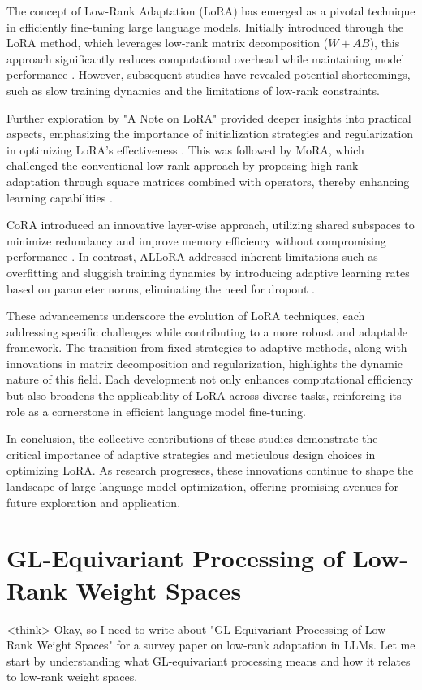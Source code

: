 \documentclass[conference]{IEEEtran}
\begin{document}
The concept of Low-Rank Adaptation (LoRA) has emerged as a pivotal technique in efficiently fine-tuning large language models. Initially introduced through the LoRA method, which leverages low-rank matrix decomposition ($W + AB$), this approach significantly reduces computational overhead while maintaining model performance \cite{bX}. However, subsequent studies have revealed potential shortcomings, such as slow training dynamics and the limitations of low-rank constraints.

Further exploration by "A Note on LoRA" provided deeper insights into practical aspects, emphasizing the importance of initialization strategies and regularization in optimizing LoRA's effectiveness \cite{bX}. This was followed by MoRA, which challenged the conventional low-rank approach by proposing high-rank adaptation through square matrices combined with operators, thereby enhancing learning capabilities \cite{bX}.

CoRA introduced an innovative layer-wise approach, utilizing shared subspaces to minimize redundancy and improve memory efficiency without compromising performance \cite{bX}. In contrast, ALLoRA addressed inherent limitations such as overfitting and sluggish training dynamics by introducing adaptive learning rates based on parameter norms, eliminating the need for dropout \cite{bX}.

These advancements underscore the evolution of LoRA techniques, each addressing specific challenges while contributing to a more robust and adaptable framework. The transition from fixed strategies to adaptive methods, along with innovations in matrix decomposition and regularization, highlights the dynamic nature of this field. Each development not only enhances computational efficiency but also broadens the applicability of LoRA across diverse tasks, reinforcing its role as a cornerstone in efficient language model fine-tuning.

In conclusion, the collective contributions of these studies demonstrate the critical importance of adaptive strategies and meticulous design choices in optimizing LoRA. As research progresses, these innovations continue to shape the landscape of large language model optimization, offering promising avenues for future exploration and application.

\section{GL-Equivariant Processing of Low-Rank Weight Spaces}
<think>
Okay, so I need to write about "GL-Equivariant Processing of Low-Rank Weight Spaces" for a survey paper on low-rank adaptation in LLMs. Let me start by understanding what GL-equivariant processing means and how it relates to low-rank weight spaces.
\end{document}
